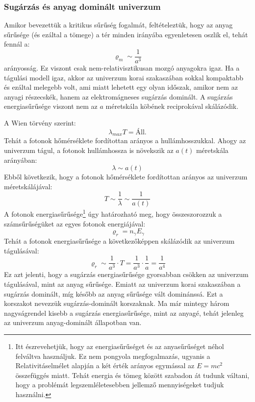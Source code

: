 \documentclass[../main.tex]{subfiles}
\begin{document}
\subsubsection{Sugárzás és anyag dominált univerzum}
Amikor bevezettük a kritikus sűrűség fogalmát, feltételeztük, hogy az anyag sűrűsége (és ezáltal a tömege) a tér minden irányába egyenletesen oszlik el, tehát fennál a:
\begin{equation}
    \varrho_m \sim \frac{1}{a^3}
\end{equation}
arányosság. Ez viszont csak nem-relativisztikusan mozgó anyagokra igaz. Ha a tágulási modell igaz, akkor az univerzum korai szakaszában sokkal kompaktabb és ezáltal melegebb volt, ami miatt lehetett egy olyan időszak,
amikor nem az anyagi részecskék, hanem az elektromágneses sugárzás dominált. A sugárzás energiasűrűsége viszont nem az $a$ méretskála köbének reciprokával skálázódik.

A Wien törvény szerint:
\begin{equation}
    \lambda_{max} T = \text{Áll.}
\end{equation}
Tehát a fotonok hőmérséklete fordítottan arányos a hullámhosszukkal. Ahogy az univerzum tágul, a fotonok hullámhossza is növekszik az $a(t)$ méretskála arányában:
\begin{equation}
    \lambda \sim a(t)
\end{equation}
Ebből következik, hogy a fotonok hőmérséklete fordítottan arányos az univerzum méretskálájával:
\begin{equation}
    T \sim \frac{1}{\lambda} \sim \frac{1}{a(t)}
\end{equation}
A fotonok energiasűrűsége\footnote{
    Itt észrevehetjük, hogy az energiasűrűséget és az anyasűrűséget néhol felváltva használjuk. Ez nem pongyola megfogalmazás, ugyanis a Relativitáselmélet alapján a két érték arányos egymással az $E = mc^2$ összefüggés miatt.
    Tehát energia és tömeg között szabadon át tudunk váltani, hogy a problémát legszemléletesebben jellemző mennyiségeket tudjuk használni.
}
úgy határozható meg, hogy összeszorozzuk a számsűrűségüket az egyes fotonok energiájával:
\begin{equation}
    \varrho_r = n_{\gamma} E_{\gamma}
\end{equation}
Tehát a fotonok energiasűrűsége a következőképpen skálázódik az univerzum tágulásával:
\begin{equation}
    \varrho_r \sim \frac{1}{a^3} \cdot T = \frac{1}{a^3} \cdot \frac{1}{a} = \frac{1}{a^4}
\end{equation}
Ez azt jelenti, hogy a sugárzás energiasűrűsége gyorsabban csökken az univerzum tágulásával, mint az anyag sűrűsége. Emiatt az univerzum korai szakaszában a sugárzás dominált, míg később az anyag sűrűsége vált dominánssá. 
Ezt a korszakot nevezzük sugárzás-dominált korszaknak. Ma már mintegy három nagyságrendel kisebb a sugárzás energiasűrűsége, mint az anyagé, tehát jelenleg az univerzum anyag-dominált állapotban van.
\end{document}
